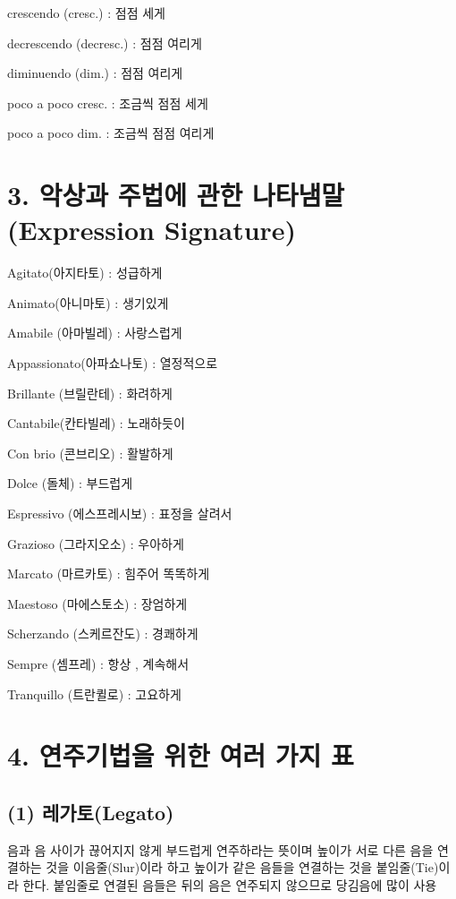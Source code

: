 \documentclass[12pt, a4paper, oneside]{book}
\let\stdsection\section
\renewcommand\section{\newpage\stdsection}
\begin{document}
crescendo (cresc.) : 점점 세게

decrescendo (decresc.) : 점점 여리게

diminuendo (dim.) : 점점 여리게

poco a poco cresc. : 조금씩 점점 세게

poco a poco dim. : 조금씩 점점 여리게

%
	\section{3. 악상과 주법에 관한 나타냄말 (Expression Signature) }


Agitato(아지타토) : 성급하게

Animato(아니마토) : 생기있게

Amabile (아마빌레) : 사랑스럽게

Appassionato(아파쇼나토) : 열정적으로

Brillante (브릴란테) : 화려하게

Cantabile(칸타빌레) : 노래하듯이

Con brio (콘브리오) : 활발하게

Dolce (돌체) : 부드럽게

Espressivo (에스프레시보) : 표정을 살려서

Grazioso (그라지오소) : 우아하게

Marcato (마르카토) : 힘주어 똑똑하게

Maestoso (마에스토소) : 장엄하게

Scherzando (스케르잔도) : 경쾌하게

Sempre (셈프레) : 항상 , 계속해서

Tranquillo (트란퀼로) : 고요하게

%
	\section{4. 연주기법을 위한 여러 가지 표}

	\subsection{(1) 레가토(Legato)}

음과 음 사이가 끊어지지 않게 부드럽게 연주하라는 뜻이며
높이가 서로 다른 음을 연결하는 것을 이음줄(Slur)이라 하고
높이가 같은 음들을 연결하는 것을 붙임줄(Tie)이라 한다. 붙임줄로
연결된 음들은 뒤의 음은 연주되지 않으므로 당김음에 많이 사용
\end{document}
